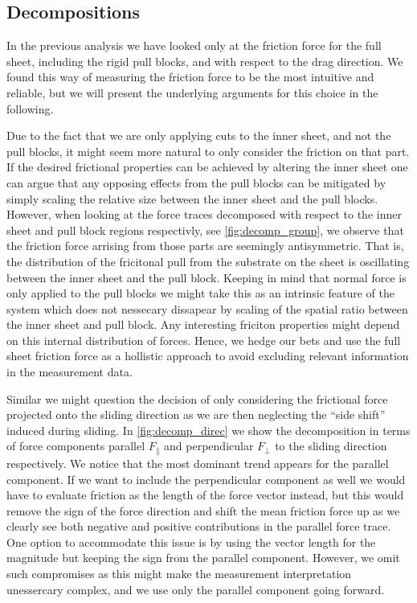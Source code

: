 \subsection{Decompositions}
In the previous analysis we have looked only at the friction force for the full
sheet, including the rigid pull blocks, and with
respect to the drag direction. We found this way of measuring the friction force to be the most intuitive and reliable, but we will present the underlying arguments for this choice in the following.

Due to the fact that we are only applying cuts to the inner sheet, and not the
pull blocks, it might seem more natural to only consider the friction on that
part. If the desired frictional properties can be achieved by altering the inner
sheet one can argue that any opposing effects from the pull blocks can be
mitigated by simply scaling the relative size between the inner sheet and the pull
blocks. However, when looking at the force traces decomposed with respect to the
inner sheet and pull block regions respectivly, see \cref{fig:decomp_group}, we
observe that the friction force arrising from those parts are seemingly
antisymmetric. That is, the distribution of the fricitonal pull from the
substrate on the sheet is oscillating between the inner sheet and the pull
block. Keeping in mind that normal force is only applied to the pull blocks we
might take this as an intrinsic feature of the system which does not nessecary dissapear by scaling of the spatial ratio between the inner sheet and pull block. Any interesting friciton properties might depend on this internal distribution of forces. Hence, we hedge our bets and use the full sheet friction force as a hollistic approach to avoid excluding relevant information in the measurement data.

Similar we might question the decision of
only considering the frictional force projected onto the sliding direction as
we are then neglecting the ``side shift'' induced during sliding. In \cref{fig:decomp_direc} we show the decomposition in terms of force components parallel $F_{\parallel}$ and perpendicular $F_{\perp}$ to the sliding direction respectively. We notice that the most dominant trend appears for the parallel component. If we want to include the perpendicular component as well we would have to evaluate friction as the length of the force vector instead, but this would remove the sign of the force direction and shift the mean friction force up as we clearly see both negative and positive contributions in the parallel force trace. One option to accommodate this issue is by using the vector length for the magnitude but keeping the sign from the parallel component. However, we omit such compromises as this might make the measurement interpretation unessercary complex, and we use only the parallel component going forward. 

